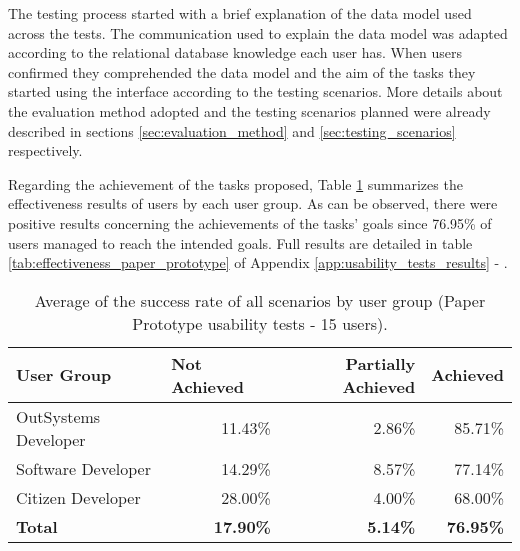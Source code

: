 The testing process started with a brief explanation of the data model used across the tests. The communication used to explain the data model was adapted according to the relational database knowledge each user has. When users confirmed they comprehended the data model and the aim of the tasks they started using the interface according to the testing scenarios. More details about the evaluation method adopted and the testing scenarios planned were already described in sections \ref{sec:evaluation_method} and \ref{sec:testing_scenarios} respectively.

Regarding the achievement of the tasks proposed, Table \ref{tab:effectiveness_summary_paper_prototype} summarizes the effectiveness results of users by each user group. As can be observed, there were positive results concerning the achievements of the tasks' goals since 76.95\% of users managed to reach the intended goals. Full results are detailed in table \ref{tab:effectiveness_paper_prototype} of Appendix \ref{app:usability_tests_results} - .

\begin{table}[tb]
  \caption{Average of the success rate of all scenarios by user group (Paper Prototype usability tests - 15 users).}
  \label{tab:effectiveness_summary_paper_prototype}
  \begin{tabular}{lrrr}
  \hline
  \rowcolor[HTML]{EFEFEF} 
  \textbf{User Group}  & \multicolumn{1}{l}{\cellcolor[HTML]{EFEFEF}\textbf{Not Achieved}} & \multicolumn{1}{C{2cm}}{\cellcolor[HTML]{EFEFEF}\textbf{Partially Achieved}} & \multicolumn{1}{l}{\cellcolor[HTML]{EFEFEF}\textbf{Achieved}} \\ \hline
  OutSystems Developer & 11.43\%                                                           & 2.86\%                                                                  & 85.71\%                                                       \\
  Software Developer   & 14.29\%                                                           & 8.57\%                                                                  & 77.14\%                                                       \\
  Citizen Developer    & 28.00\%                                                           & 4.00\%                                                                  & 68.00\%                                                       \\
  \textbf{Total}       & \textbf{17.90\%}                                                  & \textbf{5.14\%}                                                         & \textbf{76.95\%}                                              \\ \hline
  \end{tabular}
  \end{table}



